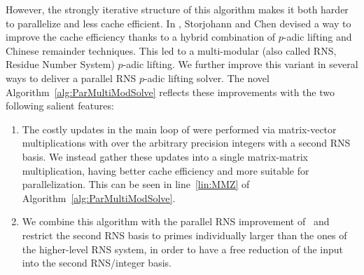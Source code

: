 However, the strongly iterative structure of this algorithm makes it both harder to parallelize and less cache
efficient.
In \cite{ChSt05}, Storjohann and Chen devised a way to improve the cache efficiency thanks to a hybrid combination of
$p$-adic lifting and Chinese remainder techniques.
This led to a multi-modular (also called RNS, Residue Number System) $p$-adic
lifting.
We further improve this variant in several ways to deliver a parallel
RNS $p$-adic lifting solver. The novel
Algorithm~\ref{alg:ParMultiModSolve} reflects these improvements with
the two following salient features:
\begin{enumerate}
\item The costly updates in the main loop of \cite{ChSt05} were
  performed via matrix-vector  multiplications with over
  the arbitrary precision integers with a second RNS basis.
  We instead gather these updates into  a single
  matrix-matrix multiplication, having better cache efficiency and more suitable
  for parallelization.
  This can be seen in line~\ref{lin:MMZ} of
  Algorithm~\ref{alg:ParMultiModSolve}.
\item We combine this algorithm with the parallel RNS improvement
  of~\cite{DGLS18} and restrict the second RNS basis to primes
  individually larger than the
  ones of the  higher-level RNS system, in order to have a free reduction of the
  input into the second RNS/integer basis.
\end{enumerate}


